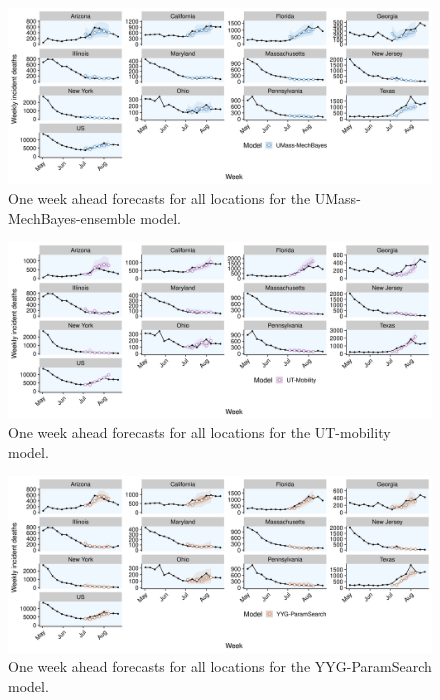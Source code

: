 \documentclass[
]{book}
\begin{document}
\begin{figure}
\includegraphics[width=1\linewidth]{../visualisation/chapter-5-results/scenario-baseline/APPENDIX-UMass-MechBayes-forecasts} \caption{One week ahead forecasts for all locations for the UMass-MechBayes-ensemble model.}\label{fig:predictions-umass-mechbayes}
\end{figure}

\begin{figure}
\includegraphics[width=1\linewidth]{../visualisation/chapter-5-results/scenario-baseline/APPENDIX-UT-Mobility-forecasts} \caption{One week ahead forecasts for all locations for the UT-mobility model.}\label{fig:predictions-ut-mobility}
\end{figure}

\begin{figure}
\includegraphics[width=1\linewidth]{../visualisation/chapter-5-results/scenario-baseline/APPENDIX-YYG-ParamSearch-forecasts} \caption{One week ahead forecasts for all locations for the YYG-ParamSearch  model.}\label{fig:predictions-yyg-paramsearch}
\end{figure}
\end{document}
